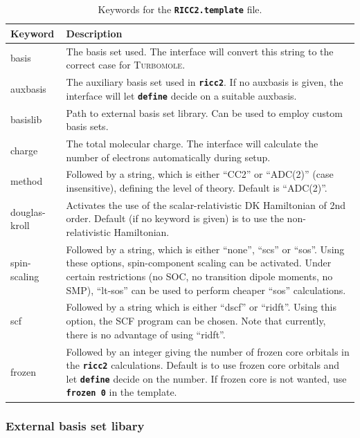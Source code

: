 \documentclass[a4paper,10pt,DIV=15,openany,twoside=false]{scrbook}
\newcommand{\todo}[1]{\textcolor{RL}{#1}}
\newcommand{\ttt}[1]{\textbf{\texttt{#1}}}
\begin{document}
\begin{table}
  \centering
  \caption{Keywords for the \ttt{RICC2.template} file.}
  \label{tab:ricc2_temp}
  \begin{tabular}{>{\ttfamily}lp{12cm}}
  \toprule
  Keyword       &Description\\
  \midrule
basis           &The basis set used. The interface will convert this string to the correct case for \textsc{Turbomole}.\\
auxbasis        &The auxiliary basis set used in \ttt{ricc2}. If no auxbasis is given, the interface will let \ttt{define} decide on a suitable auxbasis.\\
basislib        &Path to external basis set library. Can be used to employ custom basis sets.\\
charge          &The total molecular charge. The interface will calculate the number of electrons automatically during setup.\\
method          &Followed by a string, which is either ``CC2'' or ``ADC(2)'' (case insensitive), defining the level of theory. Default is ``ADC(2)''.\\
douglas-kroll   &Activates the use of the scalar-relativistic DK Hamiltonian of 2nd order. Default (if no keyword is given) is to use the non-relativistic Hamiltonian.\\
spin-scaling    &Followed by a string, which is either ``none'', ``scs'' or ``sos''. Using these options, spin-component scaling can be activated. Under certain restrictions (no SOC, no transition dipole moments, no SMP), ``lt-sos'' can be used to perform cheaper ``sos'' calculations.\\
scf             &Followed by a string which is either ``dscf'' or ``ridft''. Using this option, the SCF program can be chosen. Note that currently, there is no advantage of using ``ridft''.\\
frozen          &Followed by an integer giving the number of frozen core orbitals in the \ttt{ricc2} calculations. Default is to use frozen core orbitals and let \ttt{define} decide on the number. If frozen core is not wanted, use \ttt{frozen 0} in the template.\\
  \bottomrule
  \end{tabular}
\end{table}

\todo{\subsubsection{External basis set libary}}
\end{document}
